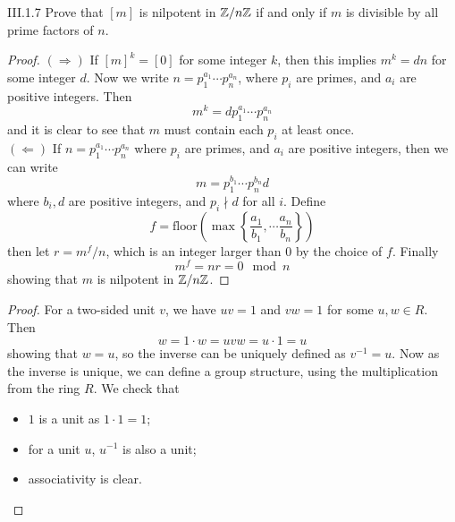 \begin{problem}{III.1.7}
Prove that $[m]$ is nilpotent in $\mathbb{Z}/n\mathbb{Z}$ if and only if $m$ is divisible by all prime factors of $n$. 
\end{problem}
\begin{proof}

\noindent $(\Rightarrow)$ If $[m]^k = [0]$ for some integer $k$, then this implies $m^k = dn$ for some integer $d$. Now we write $n = p_1^{a_1} \cdots p_n^{a_n}$, where $p_i$ are primes, and $a_i$ are positive integers. Then
\[
m^k = d p_1^{a_1} \cdots p_n^{a_n}
\]
and it is clear to see that $m$ must contain each $p_i$ at least once. \\
$(\Leftarrow)$ If $n = p_1^{a_1} \cdots p_n^{a_n}$ where $p_i$ are primes, and $a_i$ are positive integers, then we can write 
\[
m = p_1^{b_1} \cdots p_n^{b_n} d
\] 
where $b_i, d$ are positive integers, and $p_i \nmid d$ for all $i$. Define 
\[
f = \text{floor}\left(\max\left\{ \frac{a_1}{b_1}, \cdots \frac{a_n}{b_n}\right\} \right)    
\]
then let $r = m^f/n$, which is an integer larger than 0 by the choice of $f$. Finally
\[
m^f = nr = 0 \mod n
\]
showing that $m$ is nilpotent in $\mathbb{Z}/n\mathbb{Z}$.
\end{proof}

\begin{proof}
For a two-sided unit $v$, we have $uv = 1$ and $vw = 1$ for some $u,w \in R$. Then 
\[
w = 1 \cdot w = uvw = u \cdot 1 = u    
\]
showing that $w = u$, so the inverse can be uniquely defined as $v^{-1} = u$. Now as the inverse is unique, we can define a group structure, using the multiplication from the ring $R$. We check that
\begin{itemize}
	\setlength\itemsep{0pt}
	\item $1$ is a unit as $1 \cdot 1 = 1$;
	\item for a unit $u$, $u^{-1}$ is also a unit;
	\item associativity is clear.
\end{itemize}
\end{proof}

